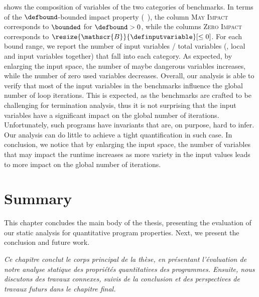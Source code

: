  shows the composition of variables of the two categories of \svcomp{} benchmarks.
In terms of the $\defbound$-bounded impact property (\cf~), the column \textsc{May Impact} corresponds to $\bounded$ for $\defbound > 0$, while the columns \textsc{Zero Impact} corresponds to $\resize{\mathscr{B}}{\definputvariable}[\le 0]$.
For each bound range, we report the number of input variables / total variables (\cf, local and input variables together) that fall into each category.
As expected, by enlarging the input space, the number of maybe dangerous variables increases, while the number of zero used variables decreases.
Overall, our analysis is able to verify that most of the input variables in the \svcomp{} benchmarks influence the global number of loop iterations.
This is expected, as the benchmarks are crafted to be challenging for termination analysis, thus it is not surprising that the input variables have a significant impact on the global number of iterations.
Unfortunately, such programs have invariants that are, on purpose, hard to infer. Our analysis can do little to achieve a tight quantification in such case.
In conclusion, we notice that by enlarging the input space, the number of variables that may impact the runtime increases as more variety in the input values leads to more impact on the global number of iterations.


\section{Summary}

This chapter concludes the main body of the thesis, presenting the evaluation of our static analysis for quantitative program properties.
Next, we present the conclusion and future work.


\frenchdiv

\emph{Ce chapitre conclut le corps principal de la thèse, en présentant l'évaluation de notre analyse statique des propriétés quantitatives des programmes.
Ensuite, nous discutons des travaux connexes, suivis de la conclusion et des perspectives de travaux futurs dans le chapitre final.}
